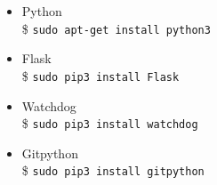     \begin{itemize}
    \item Python \\
    	\$ \texttt{sudo apt-get install python3}
    \item Flask \\
    	\$ \texttt{sudo pip3 install Flask}
   	\item Watchdog \\
	   	\$ \texttt{sudo pip3 install watchdog}
   	\item Gitpython \\
    	\$ \texttt{sudo pip3 install gitpython}
    \end{itemize}





